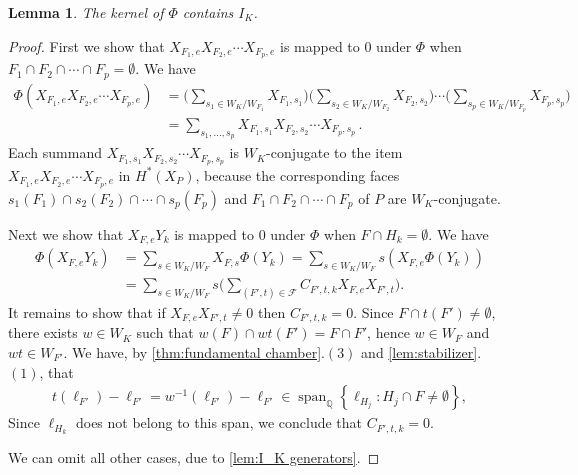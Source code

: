 \documentclass{amsart}
\theoremstyle{plain} \numberwithin{equation}{section}
\newtheorem{lemma}[theorem]{Lemma}
\theoremstyle{definition}
\newcommand{\Q}{\mathbb{Q}}
\DeclareMathOperator{\spn}{span}
\begin{document}
\begin{lemma}\label{lem:kernel I_K}
  The kernel of $\Phi$ contains $I_K$.
\end{lemma}
\begin{proof}
  First we show that $X_{F_1,e}X_{F_2,e}\cdots X_{F_p,e}$ is mapped to 0 under $\Phi$ when $F_{1}\cap F_{2}\cap\cdots\cap F_{p}=\emptyset$. 
  We have
  \begin{align*}
    \Phi\left(X_{F_1,e}X_{F_2,e}\cdots X_{F_p,e}\right)&=\biggl(\sum_{s_1\in {W_K}/{W_{F_1}}}X_{F_1,s_1}\biggr)\biggl(\sum_{s_2\in {W_K}/{W_{F_2}}}X_{F_2,s_2}\biggr)\cdots\biggl(\sum_{s_p\in {W_K}/{W_{F_p}}}X_{F_p,s_p}\biggr)\\
    &=\sum_{s_1,\ldots,s_p} X_{F_1,s_1}X_{F_2,s_2}\cdots X_{F_p,s_p}\,.
  \end{align*}
Each summand $X_{F_1,s_1}X_{F_2,s_2}\cdots X_{F_p,s_p}$ is $W_K$-conjugate to the item $X_{F_1,e}X_{F_2,e}\cdots X_{F_p,e}$ in $H^*(X_P)$, because the corresponding faces $s_1(F_{1})\cap s_2(F_{2})\cap\cdots\cap s_{p}(F_{p})$ and $F_{1}\cap F_{2}\cap\cdots\cap F_{p}$ of $P$ are $W_K$-conjugate.



  Next we show that $X_{F,e}Y_{k}$ is mapped to 0 under $\Phi$ when $F\cap H_{k}=\emptyset$. We have 
  \begin{align*}
    \Phi\left(X_{F,e}Y_{k}\right)&=\sum_{s\in {W_K}/{W_{F}}}X_{F,s}\Phi(Y_{k})=\sum_{s\in {W_K}/{W_{F}}}s\left(X_{F,e}\Phi(Y_{k})\right)\\
    &=\sum_{s\in {W_K}/{W_{F}}}s\biggl(\sum_{(F',t)\in\mathcal{F}}  C_{F',t,k}X_{F,e}X_{F',t}\biggr). 
  \end{align*}
  It remains to show that if  $X_{F,e}X_{F',t}\ne 0$ then $C_{F',t,k}=0$. Since $F\cap t(F')\ne \emptyset$, there exists $w\in W_K$ such that $w(F)\cap wt(F')=F\cap F'$, hence $w\in W_{F}$ and $wt \in W_{F'}$. We have, by \cref{thm:fundamental chamber}.$(3)$ and \cref{lem:stabilizer}.$(1)$, that
  \begin{align*}
    t(\ell_{F'})-\ell_{F'}=w^{-1}(\ell_{F'})-\ell_{F'}\in \spn_{\Q}\left\{\ell_{H_j}: H_j\cap F\ne\emptyset\right\},
  \end{align*} 
 Since $\ell_{H_k}$ does not belong to this span, we conclude that $C_{F',t,k}=0$.

We can omit all other cases, due to \cref{lem:I_K generators}. 
\qedhere
\end{proof}
\end{document}
